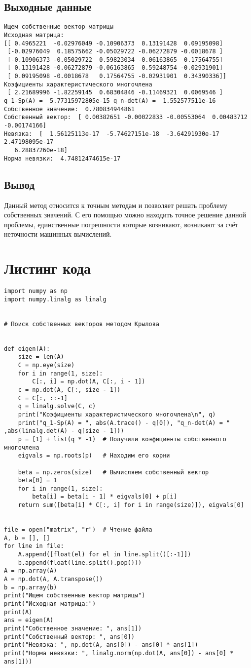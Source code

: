 \documentclass[11.4pt]{article}
\begin{document}
	\subsection{Выходные данные}
\begin{verbatim}
Ищем собственные вектор матрицы
Исходная матрица:
[[ 0.4965221  -0.02976049 -0.10906373  0.13191428  0.09195098]
 [-0.02976049  0.18575662 -0.05029722 -0.06272879 -0.0018678 ]
 [-0.10906373 -0.05029722  0.59823034 -0.06163865  0.17564755]
 [ 0.13191428 -0.06272879 -0.06163865  0.59248754 -0.02931901]
 [ 0.09195098 -0.0018678   0.17564755 -0.02931901  0.34390336]]
Коэфициенты характеристического многочлена
 [ 2.21689996 -1.82259145  0.68304846 -0.11469321  0.0069546 ]
q_1-Sp(A) =  5.77315972805e-15 q_n-det(A) =  1.552577511e-16
Собственное значение:  0.780834944861
Собственный вектор:  [ 0.00382651 -0.00022833 -0.00553064  0.00483712 -0.00174166]
Невязка:  [  1.56125113e-17  -5.74627151e-18  -3.64291930e-17   2.47198095e-17
   6.28837260e-18]
Норма невязки:  4.74812474615e-17
 \end{verbatim}
	\subsection{Вывод}
Данный метод относится к точным методам и позволяет решать проблему собственных значений. С его помощью можно находить точное решение данной проблемы, единственные погрешности которые возникают, возникают за счёт неточности машинных вычислений.\par
\newpage
\section{Листинг кода}
\begin{verbatim}
import numpy as np
import numpy.linalg as linalg


# Поиск собственных векторов методом Крылова


def eigen(A):
    size = len(A)
    C = np.eye(size)
    for i in range(1, size):
        C[:, i] = np.dot(A, C[:, i - 1])
    c = np.dot(A, C[:, size - 1])
    C = C[:, ::-1]
    q = linalg.solve(C, c)
    print("Коэфициенты характеристического многочлена\n", q)
    print("q_1-Sp(A) = ", abs(A.trace() - q[0]), "q_n-det(A) = " ,abs(linalg.det(A) - q[size - 1]))
    p = [1] + list(q * -1)	# Получили коэфициенты собственного многочлена
    eigvals = np.roots(p)	# Находим его корни			

    beta = np.zeros(size)	# Вычисляем собственный вектор
    beta[0] = 1
    for i in range(1, size):
        beta[i] = beta[i - 1] * eigvals[0] + p[i]
    return sum([beta[i] * C[:, i] for i in range(size)]), eigvals[0]


file = open("matrix", "r")  # Чтение файла
A, b = [], []
for line in file:
    A.append([float(el) for el in line.split()[:-1]])
    b.append(float(line.split().pop()))
A = np.array(A)
A = np.dot(A, A.transpose())
b = np.array(b)
print("Ищем собственные вектор матрицы")
print("Исходная матрица:")
print(A)
ans = eigen(A)
print("Собственное значение: ", ans[1])
print("Собственный вектор: ", ans[0])
print("Невязка: ", np.dot(A, ans[0]) - ans[0] * ans[1])
print("Норма невязки: ", linalg.norm(np.dot(A, ans[0]) - ans[0] * ans[1]))
\end{verbatim}
\end{document}
